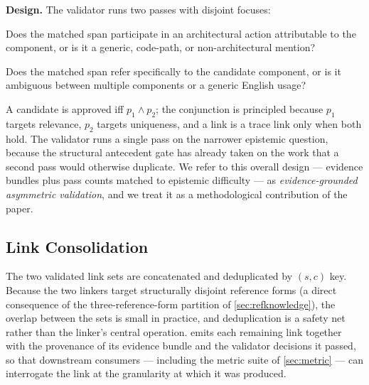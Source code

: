 \textbf{Design.} The \linkerB validator runs two passes with disjoint focuses:
\begin{description}[leftmargin=*,style=sameline]
  \item[$p_1$ --- architectural participation.] Does the matched span participate in an architectural action attributable to the component, or is it a generic, code-path, or non-architectural mention?
  \item[$p_2$ --- referential specificity.] Does the matched span refer specifically to the candidate component, or is it ambiguous between multiple components or a generic English usage?
\end{description}
A candidate is approved iff $p_1 \land p_2$; the conjunction is principled because $p_1$ targets relevance, $p_2$ targets uniqueness, and a link is a trace link only when both hold.
The \linkerC validator runs a single pass on the narrower epistemic question, because the structural antecedent gate has already taken on the work that a second pass would otherwise duplicate.
We refer to this overall design --- evidence bundles plus pass counts matched to epistemic difficulty --- as \emph{evidence-grounded asymmetric validation}, and we treat it as a methodological contribution of the paper.

\subsection{Link Consolidation}\label{sec:merge}

The two validated link sets are concatenated and deduplicated by $(s, c)$ key.
Because the two linkers target structurally disjoint reference forms (a direct consequence of the three-reference-form partition of \autoref{sec:refknowledge}), the overlap between the sets is small in practice, and deduplication is a safety net rather than the linker's central operation.
\approach emits each remaining link together with the provenance of its evidence bundle and the validator decisions it passed, so that downstream consumers --- including the metric suite of \autoref{sec:metric} --- can interrogate the link at the granularity at which it was produced.
